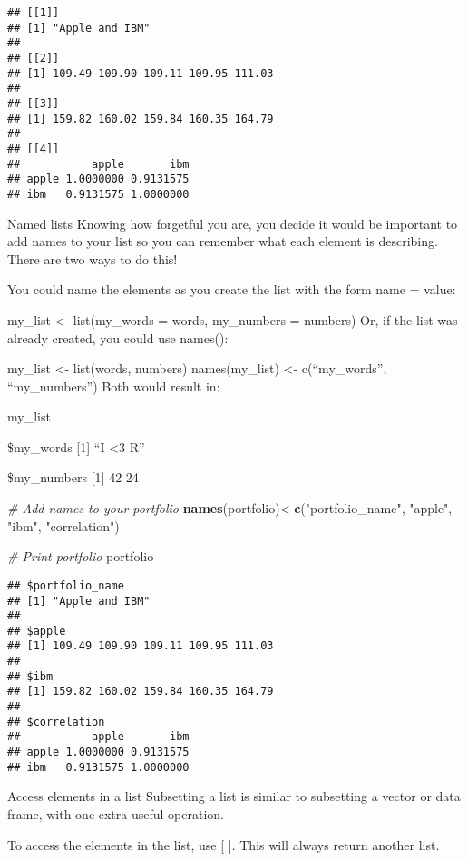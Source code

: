 \documentclass[]{article}
\newenvironment{Shaded}{\begin{snugshade}}{\end{snugshade}}
\newcommand{\KeywordTok}[1]{\textcolor[rgb]{0.13,0.29,0.53}{\textbf{#1}}}
\newcommand{\StringTok}[1]{\textcolor[rgb]{0.31,0.60,0.02}{#1}}
\newcommand{\CommentTok}[1]{\textcolor[rgb]{0.56,0.35,0.01}{\textit{#1}}}
\newcommand{\NormalTok}[1]{#1}
\begin{document}
\begin{verbatim}
## [[1]]
## [1] "Apple and IBM"
## 
## [[2]]
## [1] 109.49 109.90 109.11 109.95 111.03
## 
## [[3]]
## [1] 159.82 160.02 159.84 160.35 164.79
## 
## [[4]]
##           apple       ibm
## apple 1.0000000 0.9131575
## ibm   0.9131575 1.0000000
\end{verbatim}

Named lists Knowing how forgetful you are, you decide it would be
important to add names to your list so you can remember what each
element is describing. There are two ways to do this!

You could name the elements as you create the list with the form name =
value:

my\_list \textless{}- list(my\_words = words, my\_numbers = numbers) Or,
if the list was already created, you could use names():

my\_list \textless{}- list(words, numbers) names(my\_list) \textless{}-
c(``my\_words'', ``my\_numbers'') Both would result in:

my\_list

\$my\_words {[}1{]} ``I \textless{}3 R''

\$my\_numbers {[}1{]} 42 24

\begin{Shaded}
\begin{Highlighting}[]
\CommentTok{# Add names to your portfolio}
\KeywordTok{names}\NormalTok{(portfolio)<-}\KeywordTok{c}\NormalTok{(}\StringTok{"portfolio_name"}\NormalTok{, }\StringTok{"apple"}\NormalTok{, }\StringTok{"ibm"}\NormalTok{, }\StringTok{"correlation"}\NormalTok{)}

\CommentTok{# Print portfolio}
\NormalTok{portfolio}
\end{Highlighting}
\end{Shaded}

\begin{verbatim}
## $portfolio_name
## [1] "Apple and IBM"
## 
## $apple
## [1] 109.49 109.90 109.11 109.95 111.03
## 
## $ibm
## [1] 159.82 160.02 159.84 160.35 164.79
## 
## $correlation
##           apple       ibm
## apple 1.0000000 0.9131575
## ibm   0.9131575 1.0000000
\end{verbatim}

Access elements in a list Subsetting a list is similar to subsetting a
vector or data frame, with one extra useful operation.

To access the elements in the list, use {[} {]}. This will always return
another list.
\end{document}
